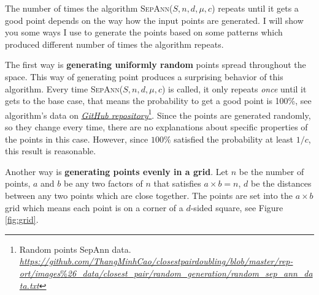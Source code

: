 \documentclass[12pt,english,]{article}
\let\origfigure\figure
\let\endorigfigure\endfigure
\renewenvironment{figure}[1][2] {
    \expandafter\origfigure\expandafter[H]
} {
    \endorigfigure
}
\begin{document}
The number of times the algorithm \textsc{SepAnn($S,n,d,\mu,c$)} repeats
until it gets a good point depends on the way how the input points are
generated. I will show you some ways I use to generate the points based
on some patterns which produced different number of times the algorithm
repeats.

The first way is \textbf{generating uniformly random} points spread
throughout the space. This way of generating point produces a surprising
behavior of this algorithm. Every time \textsc{SepAnn($S,n,d,\mu,c$)} is
called, it only repeats \emph{once} until it gets to the base case, that
means the probability to get a good point is 100\%, see algorithm's data
on
\href{https://github.com/ThangMinhCao/closestpairdoubling/blob/master/report/Images/closest_pair/random_generation/random_sep_ann_data.txt}{\emph{GitHub
repository}}\footnote{Random points SepAnn data.
  \href{https://github.com/ThangMinhCao/closestpairdoubling/blob/master/report/images_\%26_data/closest_pair/random_generation/random_sep_ann_data.txt}{\emph{https://github.com/ThangMinhCao/closestpairdoubling/blob/master/rep-
  ort/images}\%\emph{26\_data/closest\_pair/random\_generation/random\_sep\_ann\_data.txt}}}.
Since the points are generated randomly, so they change every time,
there are no explanations about specific properties of the points in
this case. However, since \(100\%\) satisfied the probability at least
\(1/c\), this result is reasonable.

Another way is \textbf{generating points evenly in a grid}. Let \(n\) be
the number of points, \(a\) and \(b\) be any two factors of \(n\) that
satisfies \(a\times b = n\), \(d\) be the distances between any two
points which are close together. The points are set into the
\(a \times b\) grid which means each point is on a corner of a
\(d\)-sided square, see Figure \ref{fig:grid}.

\begin{figure}[!h]
\centering
{}

\caption{An example of generating points in grid. A set of 35 points that gives us a $5\times7$ grid. Points are placed at corners of the squares with side is $d$ which could be any number.}
\label{fig:grid}
\end{figure}
\end{document}
